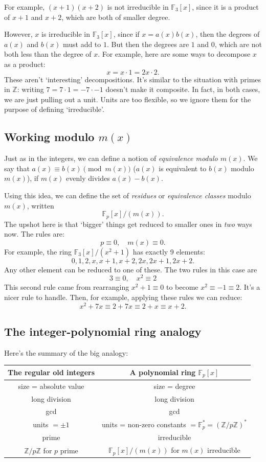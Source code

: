 \documentclass{article}
\theoremstyle{plain}
\theoremstyle{definition}
\theoremstyle{remark}
\numberwithin{theorem}{section}
\newcommand{\FF}{\mathbb{F}}
\newcommand{\ZZ}{\mathbb{Z}}
\begin{document}
For example, $(x+1)(x+2)$ is not irreducible in $\FF_3[x]$, since it is a product of $x+1$ and $x+2$, which are both of smaller degree.

However, $x$ is irreducible in $\FF_3[x]$, since if $x = a(x)b(x)$, then the degrees of $a(x)$ and $b(x)$ must add to $1$.  But then the degrees are $1$ and $0$, which are not both less than the degree of $x$.  For example, here are some ways to decompose $x$ as a product:
\[
x = x \cdot 1 = 2x \cdot 2.
\]
These aren't `interesting' decompositions.  It's similar to the situation with primes in $\ZZ$:  writing $7 = 7 \cdot 1 = -7 \cdot -1$ doesn't make it composite.  In fact, in both cases, we are just pulling out a unit.  Units are too flexible, so we ignore them for the purpose of defining `irreducible'.

\subsection{Working modulo $m(x)$}

Just as in the integers, we can define a notion of \emph{equivalence modulo $m(x)$}.  We say that $a(x) \equiv b(x) \pmod{ m(x)}$ ($a(x)$ is equivalent to $b(x)$ modulo $m(x)$), if $m(x)$ evenly divides $a(x) - b(x)$.

Using this idea, we can define the set of \emph{residues} or \emph{equivalence classes} modulo $m(x)$, written
\[
\FF_p[x]/(m(x)).
\]
The upshot here is that `bigger' things get reduced to smaller ones in \emph{two} ways now.  The rules are:
\[
p \equiv 0, \quad m(x) \equiv 0.
\]
For example, the ring $\FF_3[x]/(x^2+1)$ has exactly 9 elements:
\[
0,1,2,x,x+1,x+2,2x,2x+1,2x+2.
\]
Any other element can be reduced to one of these.  The two rules in this case are
\[
3 \equiv 0, \quad x^2 \equiv 2
\]
This second rule came from rearranging $x^2 +1 \equiv 0$ to become $x^2 \equiv -1 \equiv 2$.  It's a nicer rule to handle.  Then, for example, applying these rules we can reduce:
\[
x^2 + 7x \equiv 2 + 7x \equiv 2 + x \equiv x+2.
\]



\subsection{The integer-polynomial ring analogy}

Here's the summary of the big analogy:

\begin{center}
\begin{tabular}{ |c|c| } 
\hline
 The regular old integers & A polynomial ring $\FF_p[x]$ \\
 \hline
 size = absolute value & size = degree \\
 long division & long division \\
 gcd & gcd \\
 units $= \pm 1$ & units = non-zero constants $= \FF_p^* = (\ZZ/p\ZZ)^*$ \\
  prime & irreducible \\
 $\ZZ/p\ZZ$ for $p$ prime & $\FF_p[x]/(m(x))$ for $m(x)$ irreducible \\
 \hline
\end{tabular}
\end{center}
\end{document}
